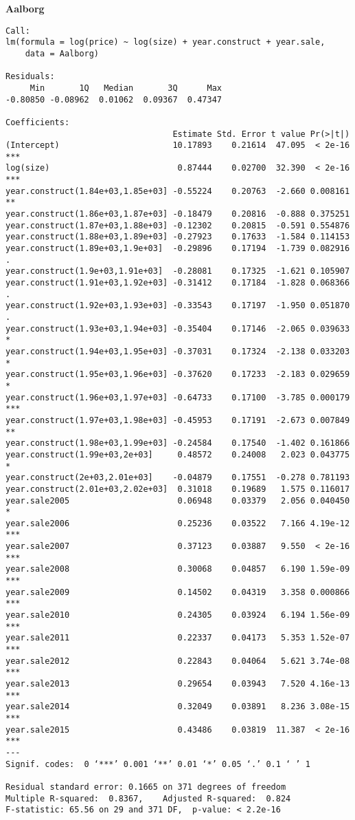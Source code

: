 \textbf{Aalborg}
\begin{lstlisting}
Call:
lm(formula = log(price) ~ log(size) + year.construct + year.sale, 
    data = Aalborg)

Residuals:
     Min       1Q   Median       3Q      Max 
-0.80850 -0.08962  0.01062  0.09367  0.47347 

Coefficients:
                                  Estimate Std. Error t value Pr(>|t|)    
(Intercept)                       10.17893    0.21614  47.095  < 2e-16 ***
log(size)                          0.87444    0.02700  32.390  < 2e-16 ***
year.construct(1.84e+03,1.85e+03] -0.55224    0.20763  -2.660 0.008161 ** 
year.construct(1.86e+03,1.87e+03] -0.18479    0.20816  -0.888 0.375251    
year.construct(1.87e+03,1.88e+03] -0.12302    0.20815  -0.591 0.554876    
year.construct(1.88e+03,1.89e+03] -0.27923    0.17633  -1.584 0.114153    
year.construct(1.89e+03,1.9e+03]  -0.29896    0.17194  -1.739 0.082916 .  
year.construct(1.9e+03,1.91e+03]  -0.28081    0.17325  -1.621 0.105907    
year.construct(1.91e+03,1.92e+03] -0.31412    0.17184  -1.828 0.068366 .  
year.construct(1.92e+03,1.93e+03] -0.33543    0.17197  -1.950 0.051870 .  
year.construct(1.93e+03,1.94e+03] -0.35404    0.17146  -2.065 0.039633 *  
year.construct(1.94e+03,1.95e+03] -0.37031    0.17324  -2.138 0.033203 *  
year.construct(1.95e+03,1.96e+03] -0.37620    0.17233  -2.183 0.029659 *  
year.construct(1.96e+03,1.97e+03] -0.64733    0.17100  -3.785 0.000179 ***
year.construct(1.97e+03,1.98e+03] -0.45953    0.17191  -2.673 0.007849 ** 
year.construct(1.98e+03,1.99e+03] -0.24584    0.17540  -1.402 0.161866    
year.construct(1.99e+03,2e+03]     0.48572    0.24008   2.023 0.043775 *  
year.construct(2e+03,2.01e+03]    -0.04879    0.17551  -0.278 0.781193    
year.construct(2.01e+03,2.02e+03]  0.31018    0.19689   1.575 0.116017    
year.sale2005                      0.06948    0.03379   2.056 0.040450 *  
year.sale2006                      0.25236    0.03522   7.166 4.19e-12 ***
year.sale2007                      0.37123    0.03887   9.550  < 2e-16 ***
year.sale2008                      0.30068    0.04857   6.190 1.59e-09 ***
year.sale2009                      0.14502    0.04319   3.358 0.000866 ***
year.sale2010                      0.24305    0.03924   6.194 1.56e-09 ***
year.sale2011                      0.22337    0.04173   5.353 1.52e-07 ***
year.sale2012                      0.22843    0.04064   5.621 3.74e-08 ***
year.sale2013                      0.29654    0.03943   7.520 4.16e-13 ***
year.sale2014                      0.32049    0.03891   8.236 3.08e-15 ***
year.sale2015                      0.43486    0.03819  11.387  < 2e-16 ***
---
Signif. codes:  0 ‘***’ 0.001 ‘**’ 0.01 ‘*’ 0.05 ‘.’ 0.1 ‘ ’ 1

Residual standard error: 0.1665 on 371 degrees of freedom
Multiple R-squared:  0.8367,	Adjusted R-squared:  0.824 
F-statistic: 65.56 on 29 and 371 DF,  p-value: < 2.2e-16
\end{lstlisting}